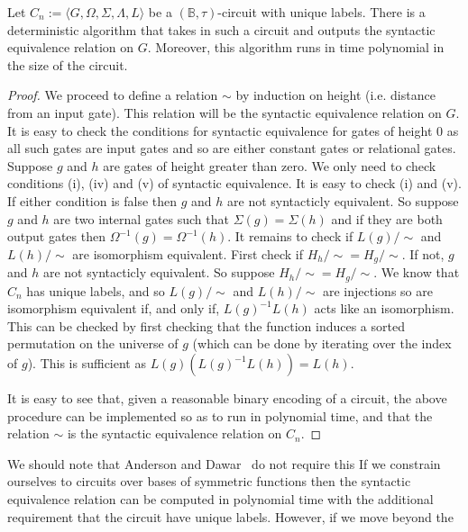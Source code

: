 \documentclass[../paper.tex]{subfiles}
\begin{document}
\begin{lem}
Let $C_n := \langle G, \Omega, \Sigma, \Lambda, L \rangle$ be a $(\mathbb{B}, \tau)$-circuit with unique labels. There is a deterministic algorithm that takes in such a circuit and outputs the syntactic equivalence relation on $G$. Moreover, this algorithm runs in time polynomial in the size of the circuit.
\label{lem:syntactic_equivilence_poly}
\end{lem}
\begin{proof}
We proceed to define a relation $\sim$ by induction on height (i.e. distance from an input gate). This relation will be the syntactic equivalence relation on $G$. It is easy to check the conditions for syntactic equivalence for gates of height 0 as all such gates are input gates and so are either constant gates or relational gates. Suppose $g$ and $h$ are gates of height greater than zero. We only need to check conditions (i), (iv) and (v) of syntactic equivalence. It is easy to check (i) and (v). If either condition is false then $g$ and $h$ are not syntacticly equivalent. So suppose $g$ and $h$ are two internal gates such that $\Sigma (g) = \Sigma(h)$ and if they are both output gates then $\Omega^{-1}(g) = \Omega^{-1}(h)$. It remains to check if $L(g)/{\sim}$ and $L(h)/{\sim}$ are isomorphism equivalent. First check if $H_h /{\sim} = H_g /{\sim}$. If not, $g$ and $h$ are not syntacticly equivalent. So suppose $H_h /{\sim} = H_g /{\sim}$. We know that $C_n$ has unique labels, and so $L(g)/{\sim}$ and $L(h)/{\sim}$ are injections so are isomorphism equivalent if, and only if, $L(g)^{-1}L(h)$ acts like an isomorphism. This can be checked by first checking that the function induces a sorted permutation on the universe of $g$ (which can be done by iterating over the index of $g$). This is sufficient as $L(g)(L(g)^{-1}L(h)) = L(h)$.

It is easy to see that, given a reasonable binary encoding of a circuit, the above procedure can be implemented so as to run in polynomial time, and that the relation $\sim$ is the syntactic equivalence relation on $C_n$.
\end{proof}

We should note that Anderson and Dawar~\cite{} do not require this 
If we constrain ourselves to circuits over bases of symmetric functions then the syntactic equivalence relation can be computed in polynomial time with the additional requirement that the circuit have unique labels. However, if we move beyond the 
\end{document}
